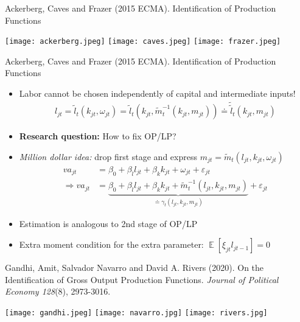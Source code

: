 \documentclass[aspectratio=169,compress,t,xcolor=table]{beamer}
\DeclareMathOperator{\E}{\mathbb{E}}                       %
\begin{document}
\begin{frame}{}
Ackerberg, Caves and Frazer (2015 ECMA). Identification of Production Functions \\ \phantom{,ou}
  \begin{center}
    \texttt{[image: ackerberg.jpeg]} \hspace*{1em}
    \texttt{[image: caves.jpeg]} \hspace*{1em}
    \texttt{[image: frazer.jpeg]}
  \end{center}
\end{frame}
\addtocounter{framenumber}{-1}

\begin{frame}{}
Ackerberg, Caves and Frazer (2015 ECMA). Identification of Production Functions
  \begin{itemize}
    \vfill\item Labor cannot be chosen independently of capital and intermediate inputs!
    \begin{align*}
      l_{jt} = \tilde{l}_t(k_{jt}, \omega_{jt}) = \tilde{l}_t(k_{jt}, \tilde{m}^{-1}_t(k_{jt}, m_{jt})) \doteq \tilde{\tilde{l}}_{t} (k_{jt}, m_{jt})
    \end{align*}
    \vfill\item {\color{MyStructure}\textbf{Research question:}} How to fix OP/LP?
    \vfill\item {\color{MyStructure}\textit{Million dollar idea:}} drop first stage and express \(m_{jt} = \tilde{m}_t (l_{jt}, k_{jt}, \omega_{jt})\)
    \begin{align*}
      va_{jt} &= \beta_0 + \beta_l l_{jt} + \beta_k k_{jt} + \omega_{jt} + \varepsilon_{jt} \\[0.5em]
      \Rightarrow va_{jt} &= \underbrace{\beta_0 + \beta_l l_{jt} + \beta_k k_{jt} + \tilde{m}^{-1}_t(l_{jt}, k_{jt}, m_{jt})}_{\doteq \gamma_t (l_{jt}, k_{jt}, m_{jt})} + \varepsilon_{jt}
    \end{align*}
    \vfill\item Estimation is analogous to 2nd stage of OP/LP
    \vfill\item Extra moment condition for the extra parameter: \(\E[\xi_{jt} l_{jt-1}] = 0\)
  \end{itemize}
\end{frame}

\begin{frame}{}
Gandhi, Amit, Salvador Navarro and David A. Rivers (2020). On the Identification of Gross Output Production Functions. \textit{Journal of Political Economy 128}(8), 2973-3016.
  \begin{center}
    \texttt{[image: gandhi.jpeg]} \hspace*{1em}
    \texttt{[image: navarro.jpg]} \hspace*{1em}
    \texttt{[image: rivers.jpg]}
  \end{center}
\end{frame}
\addtocounter{framenumber}{-1}
\end{document}
